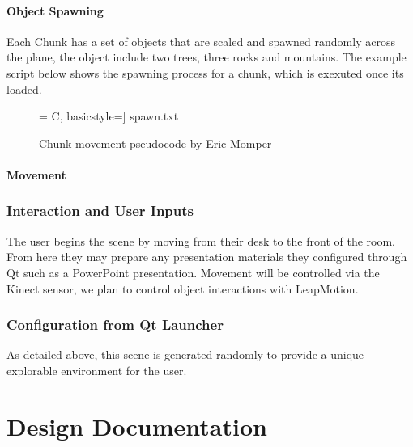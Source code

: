 \documentclass[a4paper,10pt]{article}
\begin{document}
\paragraph{Object Spawning}
Each Chunk has a set of objects that are scaled and spawned randomly across the plane, the object include two trees, three rocks and mountains. The example script below shows the spawning process for a chunk, which is exexuted once its loaded. 
\begin{figure}[H]
	\centerline{ = C, basicstyle=\small] {spawn.txt}}
	\label{fig:terrainMoveCode}
	\caption{Chunk movement pseudocode by Eric Momper}
\end{figure}


\paragraph{Movement}



\subsubsection{Interaction and User Inputs}
The user begins the scene by moving from their desk to the front of the room. From here they may prepare any presentation materials they configured through Qt such as a PowerPoint presentation. Movement will be controlled via the Kinect sensor, we plan to control object interactions with LeapMotion. 

\subsubsection{Configuration from Qt Launcher}
As detailed above, this scene is generated randomly to provide a unique explorable environment for the user.
\pagebreak

\section{Design Documentation}
\end{document}
